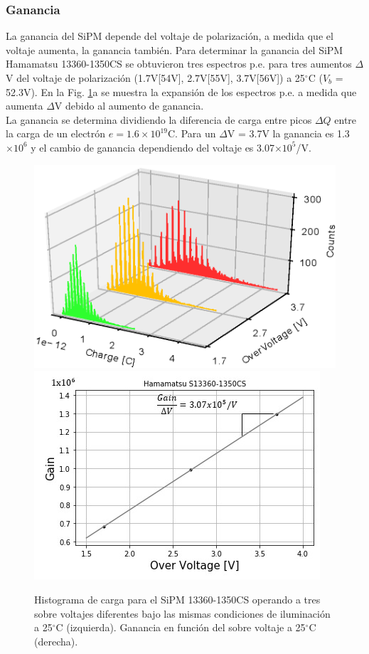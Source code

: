 \subsubsection{Ganancia}

La ganancia del SiPM depende del voltaje de polarización, a medida que el voltaje aumenta, la ganancia también. Para determinar la ganancia del SiPM Hamamatsu 13360-1350CS se obtuvieron tres espectros p.e. para tres aumentos $\Delta$V del voltaje de polarización (1.7V[54V], 2.7V[55V], 3.7V[56V]) a 25$^{\circ}$C ($V_b$ = 52.3V). En la Fig. \ref{Gain}a se muestra la expansión de los espectros p.e. a medida que aumenta $\Delta$V debido al aumento de ganancia. \\

La ganancia se determina dividiendo la diferencia de carga entre picos $\Delta Q$ entre la carga de un electrón $e = 1.6 \times10^{19}$C. Para un $\Delta$V = 3.7V la ganancia es 1.3$\times10^6$ y el cambio de ganancia dependiendo del voltaje es 3.07$\times10^5$/V.

\begin{figure}[h!]
\centering
\includegraphics[scale=0.68]{Figures/GainCharge} 
\includegraphics[scale=0.55]{Figures/Gain.jpeg}
\caption{Histograma de carga para el SiPM 13360-1350CS operando a tres sobre voltajes diferentes bajo las mismas condiciones de iluminación a 25$^{\circ}$C (izquierda). Ganancia en función del sobre voltaje a 25$^{\circ}$C (derecha). }
\label{Gain}
\end{figure}

